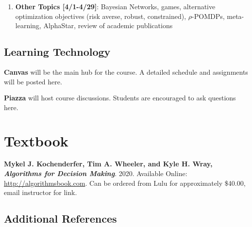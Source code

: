 \documentclass[9pt]{article}
\begin{document}
\begin{enumerate}[noitemsep]
\begin{multicols}{2}
\begin{itemize}[noitemsep]
            \item Bayesian filters
            \item Particle filters
            \item Partially observable Markov decision processes (POMDPs)
            \item Exact POMDP methods
            \item Offline POMDP methods
            \item Online POMDP methods
            \item QMDP
        \end{itemize}
        \end{multicols}
    \item \textbf{Other Topics [4/1-4/29]}: Bayesian Networks, games, alternative optimization objectives (risk averse, robust, constrained), $\rho$-POMDPs, meta-learning, AlphaStar, review of academic publications
\end{enumerate}

\begin{samepage}
\section*{Learning Technology}

\textbf{Canvas} will be the main hub for the course. A detailed schedule and assignments will be posted here.

\textbf{Piazza} will host course discussions. Students are encouraged to ask questions here.
\end{samepage}

\section*{Textbook}

\textbf{Mykel J. Kochenderfer, Tim A. Wheeler, and Kyle H. Wray, \textit{Algorithms for Decision Making}}. 2020. Available Online: \url{http://algorithmsbook.com}. Can be ordered from Lulu for approximately \$40.00, email instructor for link.

\subsection*{Additional References}
\end{document}
